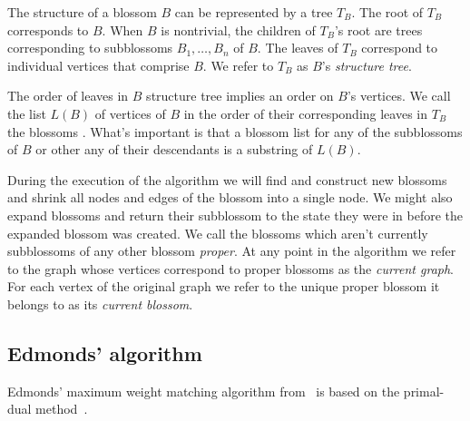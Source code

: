 The structure of a blossom $B$ can be represented by a tree $T_B$. The root of $T_B$ corresponds to $B$. When $B$ is nontrivial, the children of $T_B$'s root are trees corresponding to subblossoms $B_1, \dots, B_n$ of $B$. The leaves of $T_B$ correspond to individual vertices that comprise $B$. We refer to $T_B$ as $B$'s \textit{structure tree}.

The order of leaves in $B$ structure tree implies an order on $B$'s vertices. We call the list $L(B)$ of vertices of $B$ in the order of their corresponding leaves in $T_B$ the blossoms . What's important is that a blossom list for any of the subblossoms of $B$ or other any of their descendants is a substring of $L(B)$.

During the execution of the algorithm we will find and construct new blossoms and shrink all nodes and edges of the blossom into a single node. We might also expand blossoms and return their subblossom to the state they were in before the expanded blossom was created. We call the blossoms which aren't currently subblossoms of any other blossom \textit{proper}. At any point in the algorithm we refer to the graph whose vertices correspond to proper blossoms as the \textit{current graph}. For each vertex of the original graph we refer to the unique proper blossom it belongs to  as its \textit{current blossom}.

\subsection{Edmonds' algorithm}

Edmonds' maximum weight matching algorithm from~\cite{edmonds1965maximum} is based on the primal-dual method~\cite{lawler2001combinatorial}.


